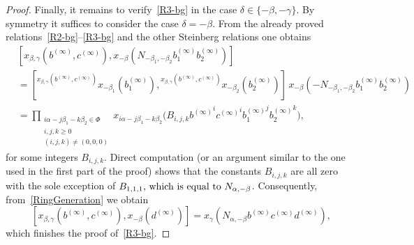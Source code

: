 \documentclass[oneside, 11pt]{amsart}
\numberwithin{equation}{section}
\theoremstyle{definition}
\theoremstyle{remark}
\newcommand{\up}[2]{{^{#1}\!{#2}}}
\begin{document}
\begin{proof}
 Finally, it remains to verify~\eqref{R3-bg} in the case $\delta \in \{-\beta, -\gamma\}$.
 By symmetry it suffices to consider the case $\delta = -\beta$.
 From the already proved relations~\eqref{R2-bg}--\eqref{R3-bg} and the other Steinberg relations one obtains
 \begin{align*}
  &[x_{\beta, \gamma}(b^{(\infty)}, c^{(\infty)}),
  x_{-\beta}(N_{-\beta_1, -\beta_2} b_1^{(\infty)} b_2^{(\infty)})] \\
  &= [\up{x_{\beta, \gamma}(b^{(\infty)}, c^{(\infty)})}
   {x_{-\beta_1}(b_1^{(\infty)})},
  \up{x_{\beta, \gamma}(b^{(\infty)}, c^{(\infty)})}
   {x_{-\beta_2}(b_2^{(\infty)})}]\,
  x_{-\beta}(-N_{-\beta_1, -\beta_2} b_1^{(\infty)} b_2^{(\infty)})\\
  &= \prod_{\substack{i\alpha - j\beta_1 - k\beta_2 \in \Phi\\ i, j, k \geq 0\\ (i, j, k) \neq (0, 0, 0)}}
  x_{i\alpha - j\beta_1 - k\beta_2}\bigl(B_{i, j, k} {b^{(\infty)}}^i {c^{(\infty)}}^i {b_1^{(\infty)}}^j {b_2^{(\infty)}}^k\bigr),  
 \end{align*}
for some integers $B_{i,j,k}$.
Direct computation (or an argument similar to the one used in the first part of the proof) shows that the constants \(B_{i, j, k}\) are all zero with the sole exception of \(B_{1, 1, 1}$, which is equal to $N_{\alpha, -\beta}\). Consequently, from~\cref{RingGeneration} we obtain
 \[[x_{\beta, \gamma}(b^{(\infty)}, c^{(\infty)}), x_{-\beta}(d^{(\infty)})] = x_\gamma(N_{\alpha, -\beta} b^{(\infty)} c^{(\infty)} d^{(\infty)}),\]
which finishes the proof of~\eqref{R3-bg}.
\end{proof}
\end{document}
